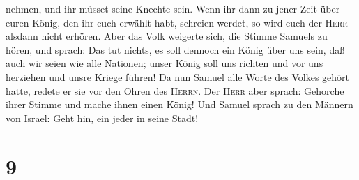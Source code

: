nehmen, und ihr müsset seine Knechte sein.  Wenn ihr dann
zu jener Zeit über euren König, den ihr euch erwählt habt, schreien
werdet, so wird euch der \textsc{Herr} alsdann nicht erhören.
 Aber das Volk weigerte sich, die Stimme Samuels zu
hören, und sprach: Das tut nichts, es soll dennoch ein König über uns
sein,  daß auch wir seien wie alle Nationen; unser König
soll uns richten und vor uns herziehen und unsre Kriege führen!
 Da nun Samuel alle Worte des Volkes gehört hatte, redete
er sie vor den Ohren des \textsc{Herrn}.  Der
\textsc{Herr} aber sprach: Gehorche ihrer Stimme und mache ihnen einen
König! Und Samuel sprach zu den Männern von Israel: Geht hin, ein jeder
in seine Stadt!

\hypertarget{section-8}{%
\section{9}\label{section-8}}

